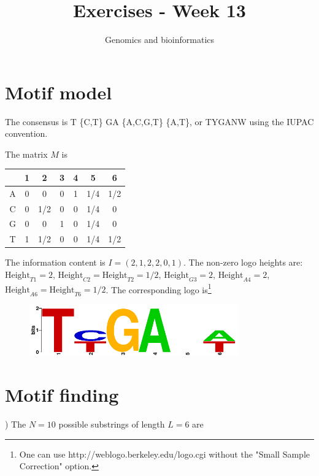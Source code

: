 \documentclass[a4paper,11pt]{article}
\title{Exercises - Week 13}
\date{}
\author{Genomics and bioinformatics}
\begin{document}
\maketitle

\section{Motif model}

\noindent The consensus is T \{C,T\} GA \{A,C,G,T\} \{A,T\}, or TYGANW using the IUPAC convention. 

\noindent The matrix $M$ is 

 
\begin{table}[h!]
\begin{center}
\begin{tabular}{|c|c|c|c|c|c|c|}
\hline
 & 1 & 2 & 3 & 4 & 5 & 6\\
\hline
A & 0 & 0 & 0 & 1 & 1/4 & 1/2\\
\hline
C & 0 & 1/2 & 0 & 0 & 1/4 & 0\\
\hline
G & 0 & 0 & 1 & 0 & 1/4 & 0\\
\hline
T & 1 & 1/2 & 0 & 0 & 1/4 & 1/2\\
 \hline
\end{tabular}
\end{center}
\end{table}

\noindent The information content is $I = (2, 1, 2, 2, 0, 1)$. The non-zero logo heights are: $\mbox{Height}_{T1} = 2$, $\mbox{Height}_{C2} = \mbox{Height}_{T2} = 1/2$, $\mbox{Height}_{G3} = 2$, $\mbox{Height}_{A4} = 2$, $\mbox{Height}_{A6} = \mbox{Height}_{T6} = 1/2$. The corresponding logo is\footnote{One can use http://weblogo.berkeley.edu/logo.cgi without the "Small Sample Correction" option.}

\begin{figure}[h!]
\centering\includegraphics[width=9cm]{Logo.png}
\end{figure}

\section{Motif finding}

) The $N=10$ possible substrings of length $L=6$ are
\end{document}
